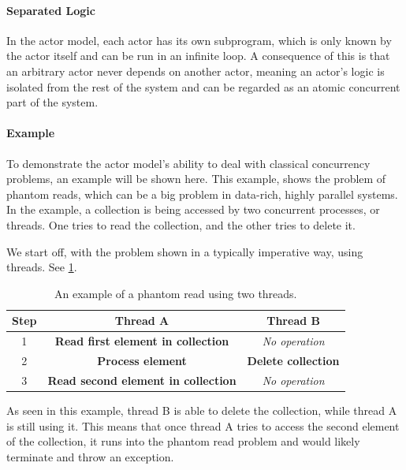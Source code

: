\paragraph{Separated Logic}
In the actor model, each actor has its own subprogram, which is only known by the actor itself and can be run in an infinite loop. A consequence of this is that an arbitrary actor never depends on another actor, meaning an actor's logic is isolated from the rest of the system and can be regarded as an atomic concurrent part of the system.

\paragraph{Example}
To demonstrate the actor model's ability to deal with classical concurrency problems, an example will be shown here. This example, shows the problem of phantom reads, which can be a big problem in data-rich, highly parallel systems. In the example, a collection is being accessed by two concurrent processes, or threads. One tries to read the collection, and the other tries to delete it.

We start off, with the problem shown in a typically imperative way, using threads. See \cref{table:eximpThreads}.
%
\begin{table}[htbp]
\centering
\begin{tabular}{ | c | c | c | }
\hline
Step & Thread A & Thread B \\\hline
1 & \textbf{Read first element in collection} & \textit{No operation} \\\hline
2 & \textbf{Process element} & \textbf{Delete collection}\\\hline
3 & \textbf{\color{red} Read second element in collection} & \textit{No operation}\\\hline
\end{tabular}
\caption{An example of a phantom read using two threads.}\label{table:eximpThreads}
\end{table}

As seen in this example, thread B is able to delete the collection, while thread A is still using it. This means that once thread A tries to access the second element of the collection, it runs into the phantom read problem and would likely terminate and throw an exception.

